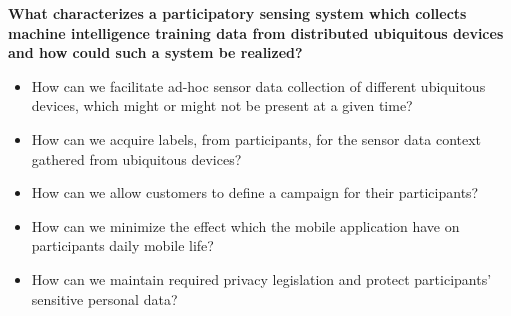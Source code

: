 
\textbf{What characterizes a participatory sensing system which collects machine intelligence training data from distributed ubiquitous devices and how could such a system be realized?}

\begin{itemize}
    \item How can we facilitate ad-hoc sensor data collection of different ubiquitous devices, which might or might not be present at a given time?

    \item How can we acquire labels, from participants, for the sensor data context gathered from ubiquitous devices?  
    
    \item How can we allow customers to define a campaign for their participants?
    
    \item How can we minimize the effect which the mobile application have on participants daily mobile life?

    \item How can we maintain required privacy legislation and protect participants' sensitive personal data? 
\end{itemize}

